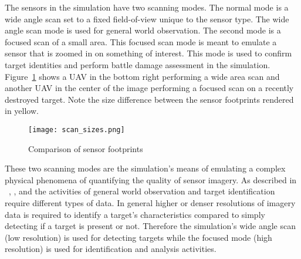 
The sensors in the simulation have two scanning modes.  The normal mode is a wide angle scan set to a fixed field-of-view unique to the sensor type.  The wide angle scan mode is used for general world observation.  The second mode is a focused scan of a small area.  This focused scan mode is meant to emulate a sensor that is zoomed in on something of interest.  This mode is used to confirm target identities and perform battle damage assessment in the simulation.  Figure~\ref{fig:scan_sizes} shows a UAV in the bottom right performing a wide area scan and another UAV in the center of the image performing a focused scan on a recently destroyed target.  Note the size difference between the sensor footprints rendered in yellow.  

\begin{figure}[H]
	\centering
	\texttt{[image: scan\_sizes.png]}
	\caption{Comparison of sensor footprints}
	\label{fig:scan_sizes}
\end{figure}

These two scanning modes are the simulation's means of emulating a complex physical phenomena of quantifying the quality of sensor imagery.  As described in ~\textcite{niirs}, \textcite{giqe}, and \textcite{analysisGIQE} the activities of general world observation and target identification require different types of data.  In general higher or denser resolutions of imagery data is required to identify a target's characteristics compared to simply detecting if a target is present or not.  Therefore the simulation's wide angle scan (low resolution) is used for detecting targets while the focused mode (high resolution) is used for identification and analysis activities.



